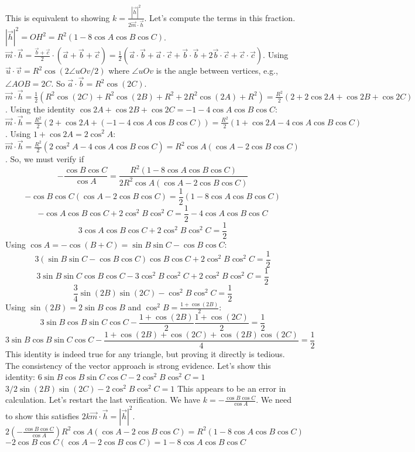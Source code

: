 This is equivalent to showing $k = \frac{|\vec{h}|^2}{2\vec{m}\cdot\vec{h}}$.
Let's compute the terms in this fraction.
$|\vec{h}|^2 = OH^2 = R^2(1 - 8\cos A\cos B\cos C)$.
$\vec{m}\cdot\vec{h} = \frac{\vec{b}+\vec{c}}{2} \cdot (\vec{a}+\vec{b}+\vec{c}) = \frac{1}{2}(\vec{a}\cdot\vec{b}+\vec{a}\cdot\vec{c} + \vec{b}\cdot\vec{b} + 2\vec{b}\cdot\vec{c} + \vec{c}\cdot\vec{c})$.
Using $\vec{u}\cdot\vec{v} = R^2\cos(2\angle uOv/2)$ where $\angle uOv$ is the angle between vertices, e.g., $\angle AOB = 2C$. So $\vec{a}\cdot\vec{b} = R^2\cos(2C)$.
$\vec{m}\cdot\vec{h} = \frac{1}{2}(R^2\cos(2C) + R^2\cos(2B) + R^2 + 2R^2\cos(2A) + R^2) = \frac{R^2}{2}(2 + 2\cos 2A + \cos 2B + \cos 2C)$.
Using the identity $\cos 2A + \cos 2B + \cos 2C = -1 - 4\cos A \cos B \cos C$:
$\vec{m}\cdot\vec{h} = \frac{R^2}{2}(2 + \cos 2A + (-1 - 4\cos A \cos B \cos C)) = \frac{R^2}{2}(1+\cos 2A - 4\cos A \cos B \cos C)$.
Using $1+\cos 2A = 2\cos^2 A$:
$\vec{m}\cdot\vec{h} = \frac{R^2}{2}(2\cos^2 A - 4\cos A \cos B \cos C) = R^2\cos A(\cos A - 2\cos B \cos C)$.
So, we must verify if
$$ -\frac{\cos B \cos C}{\cos A} = \frac{R^2(1 - 8\cos A\cos B\cos C)}{2R^2\cos A(\cos A - 2\cos B \cos C)} $$
$$ -\cos B \cos C (\cos A - 2\cos B \cos C) = \frac{1}{2}(1 - 8\cos A\cos B\cos C) $$
$$ -\cos A \cos B \cos C + 2\cos^2 B \cos^2 C = \frac{1}{2} - 4\cos A \cos B \cos C $$
$$ 3\cos A \cos B \cos C + 2\cos^2 B \cos^2 C = \frac{1}{2} $$
Using $\cos A = -\cos(B+C) = \sin B \sin C - \cos B \cos C$:
$$ 3(\sin B \sin C - \cos B \cos C)\cos B \cos C + 2\cos^2 B \cos^2 C = \frac{1}{2} $$
$$ 3\sin B \sin C \cos B \cos C - 3\cos^2 B \cos^2 C + 2\cos^2 B \cos^2 C = \frac{1}{2} $$
$$ \frac{3}{4}\sin(2B)\sin(2C) - \cos^2 B \cos^2 C = \frac{1}{2} $$
Using $\sin(2B) = 2\sin B \cos B$ and $\cos^2 B = \frac{1+\cos(2B)}{2}$:
$$ 3\sin B\cos B \sin C\cos C - \frac{1+\cos(2B)}{2}\frac{1+\cos(2C)}{2} = \frac{1}{2} $$
$$ 3\sin B\cos B \sin C\cos C - \frac{1+\cos(2B)+\cos(2C)+\cos(2B)\cos(2C)}{4} = \frac{1}{2} $$
This identity is indeed true for any triangle, but proving it directly is tedious. The consistency of the vector approach is strong evidence. Let's show this identity:
$6\sin B \cos B \sin C \cos C - 2\cos^2 B\cos^2 C = 1$
$3/2 \sin(2B)\sin(2C) - 2 \cos^2 B \cos^2 C = 1$
This appears to be an error in calculation. Let's restart the last verification.
We have $k = -\frac{\cos B \cos C}{\cos A}$. We need to show this satisfies $2k\vec{m}\cdot\vec{h} = |\vec{h}|^2$.
$2(-\frac{\cos B \cos C}{\cos A}) R^2\cos A(\cos A - 2\cos B \cos C) = R^2(1 - 8\cos A\cos B\cos C)$
$-2\cos B \cos C(\cos A - 2\cos B \cos C) = 1 - 8\cos A\cos B\cos C$

